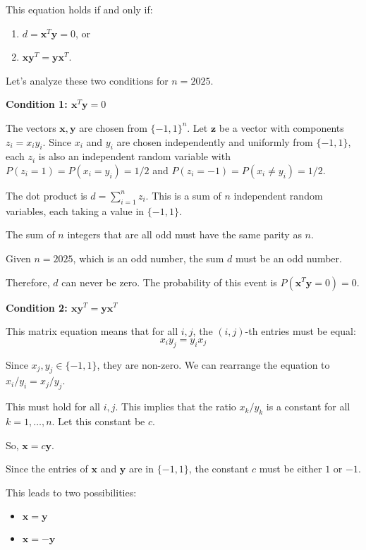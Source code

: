 \documentclass[12pt,a4paper]{article}
\theoremstyle{definition}
\begin{document}
        This equation holds if and only if:
        \begin{enumerate}
            \item $d = \mathbf{x}^T\mathbf{y} = 0$, or
            \item $\mathbf{x}\mathbf{y}^T = \mathbf{y}\mathbf{x}^T$.
        \end{enumerate}

        Let's analyze these two conditions for $n=2025$.

        \textbf{Condition 1: $\mathbf{x}^T\mathbf{y} = 0$}

        The vectors $\mathbf{x}, \mathbf{y}$ are chosen from $\{-1, 1\}^n$. Let $\mathbf{z}$ be a vector with components $z_i = x_i y_i$. Since $x_i$ and $y_i$ are chosen independently and uniformly from $\{-1, 1\}$, each $z_i$ is also an independent random variable with $P(z_i=1)=P(x_i=y_i)=1/2$ and $P(z_i=-1)=P(x_i \neq y_i)=1/2$.

        The dot product is $d = \sum_{i=1}^n z_i$. This is a sum of $n$ independent random variables, each taking a value in $\{-1, 1\}$.

        The sum of $n$ integers that are all odd must have the same parity as $n$.

        Given $n=2025$, which is an odd number, the sum $d$ must be an odd number.

        Therefore, $d$ can never be zero. The probability of this event is $P(\mathbf{x}^T\mathbf{y}=0) = 0$.

        \textbf{Condition 2: $\mathbf{x}\mathbf{y}^T = \mathbf{y}\mathbf{x}^T$}

        This matrix equation means that for all $i,j$, the $(i,j)$-th entries must be equal:
        $$x_i y_j = y_i x_j$$

        Since $x_j, y_j \in \{-1, 1\}$, they are non-zero. We can rearrange the equation to $x_i/y_i = x_j/y_j$.

        This must hold for all $i,j$. This implies that the ratio $x_k/y_k$ is a constant for all $k=1, \dots, n$. Let this constant be $c$.

        So, $\mathbf{x} = c\mathbf{y}$.

        Since the entries of $\mathbf{x}$ and $\mathbf{y}$ are in $\{-1, 1\}$, the constant $c$ must be either $1$ or $-1$.

        This leads to two possibilities:
        \begin{itemize}
            \item $\mathbf{x} = \mathbf{y}$
            \item $\mathbf{x} = -\mathbf{y}$
        \end{itemize}
\end{document}

